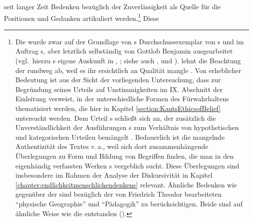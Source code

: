 seit langer Zeit Bedenken bezüglich der Zuverlässigkeit als Quelle für die
Positionen und Gedanken artikuliert
werden.\footnote{\label{Anmerkung:Einleitung:VorbehaltegegenueberderJaescheLogik}Die
{\jaeschelogik} wurde zwar auf der Grundlage von s
Durchschussexemplar von s
 und im Auftrag s, aber
letztlich selbständig von Gottlob Benjamin 
ausgearbeitet \mkbibparens{vgl.\ hierzu s eigene
Auskunft in \cite{Kant:ImmanuelKantsLogik1977}, \cite[][IX:
3.2--4.14]{Kant:GesammelteWerke1900ff.}; siehe auch
\cite[][52--55]{Rameil:KantueberLogikalsVernunftwissenschaft2004}, und
\cite{Hinske:DieemphJaesche-LogikundihrbesonderesSchicksalimRahmenderAkademie-Ausgabe2000}}.
 lehnt
die Beachtung der {\jaeschelogik} rundweg ab, weil es ihr ersichtlich an
Qualität mangle
\parencite[vgl.][21--24]{Reich:DieVollstaendigkeitderkantischenUrteilstafel1932}.
Von erheblicher Bedeutung ist aus der Sicht der vorliegenden Untersuchung, dass
 zur
Begründung seines Urteils auf Unstimmigkeiten im IX. Abschnitt der Einleitung verweist, in der
unterschiedliche Formen des Fürwahrhaltens thematisiert werden, die hier in
Kapitel \ref{section:KantsEthicsofBelief} untersucht werden. Dem Urteil
s schließt
sich  an, der zusätzlich die
Unverständlichkeit der Ausführungen s  zum
Verhältnis von hypothetischen und kategorischen Urteilen bemängelt
\parencite[vgl.][1]{Stuhlmann-Laeisz:KantsLogik1976}. Bedauerlich ist die
mangelnde Authentizität des Textes v.\,a., weil sich dort zusammenhängende
Überlegungen zu Form und Bildung von Begriffen finden, die man in den
eigenhändig verfassten Werken s vergeblich sucht. Diese
Überlegungen sind insbesondere im Rahmen der Analyse der Diskursivität in
Kapitel \ref{chapter:endlichkeitmenschlichendenkens} relevant. Ähnliche
Bedenken wie gegenüber der {\jaeschelogik} sind bezüglich der von Friedrich Theodor
 bearbeiteten \enquote{physische Geographie}
und \enquote{Pädagogik} zu berücksichtigen. Beide sind auf ähnliche
Weise wie die {\jaeschelogik} entstanden \mkbibparens{\cite[siehe][IX:
  155.12--24, 439.5--9]{Kant:GesammelteWerke1900ff.}}.} Diese
